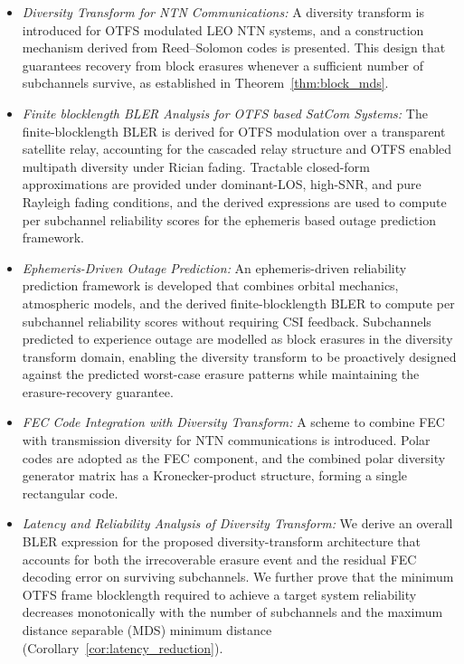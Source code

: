 \documentclass[lettersize,journal]{IEEEtran}
\begin{document}
\begin{itemize}
\item \textit{Diversity Transform for NTN Communications:}
A diversity transform is introduced for OTFS modulated LEO NTN 
systems, and a construction mechanism derived from Reed--Solomon 
codes is presented. This design that guarantees recovery from block erasures whenever a sufficient number of subchannels survive, as established in Theorem~\ref{thm:block_mds}.
\item \textit{Finite blocklength BLER Analysis for OTFS based 
SatCom Systems:}
The finite-blocklength BLER is derived for OTFS modulation over 
a transparent satellite relay, accounting for the cascaded relay 
structure and OTFS enabled multipath diversity under Rician fading. 
Tractable closed-form approximations are provided under 
dominant-LOS, high-SNR, and pure Rayleigh fading conditions, 
and the derived expressions are used to compute per subchannel 
reliability scores for the ephemeris based outage prediction 
framework.
\item \textit{Ephemeris-Driven Outage Prediction:}
An ephemeris-driven reliability prediction framework is developed 
that combines orbital mechanics, atmospheric models, and the 
derived finite-blocklength BLER to compute per subchannel 
reliability scores without requiring CSI 
feedback. Subchannels predicted to experience outage are modelled 
as block erasures in the diversity transform domain, enabling the 
diversity transform to be proactively designed against the 
predicted worst-case erasure patterns while maintaining the erasure-recovery guarantee.
\item \textit{FEC Code Integration with Diversity Transform:}
A scheme to combine FEC with transmission diversity for NTN communications is introduced. Polar codes are adopted as the FEC component, and the combined polar diversity generator matrix has a Kronecker-product structure, 
forming a single rectangular code. 
\item \textit{Latency and Reliability Analysis of Diversity Transform:}
We derive an overall BLER expression for the proposed diversity-transform architecture that accounts for both the irrecoverable erasure event and the residual FEC decoding error on surviving subchannels. We further prove that the minimum OTFS frame blocklength required to achieve a target system reliability decreases monotonically with the number of subchannels and the maximum distance separable (MDS) minimum distance (Corollary~\ref{cor:latency_reduction}).
\end{itemize}
\end{document}
